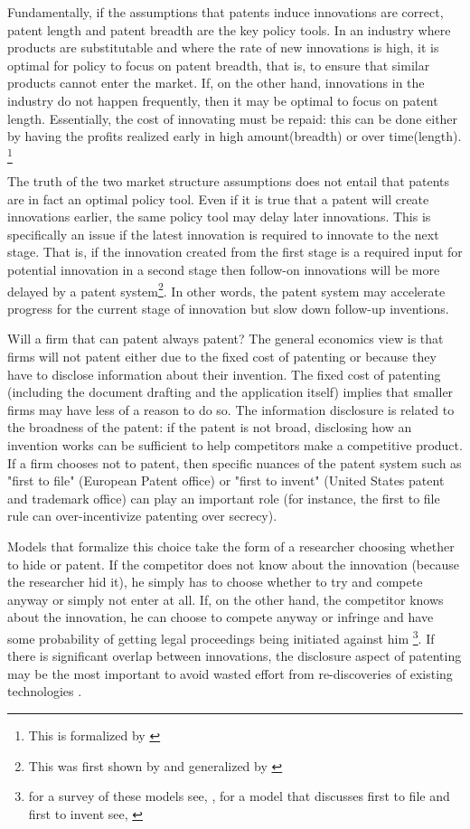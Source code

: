 Fundamentally, if the assumptions that patents induce innovations are correct, patent length and patent breadth are the key policy tools. In an industry where products are substitutable and where the rate of new innovations is high, it is optimal for policy to focus on patent breadth, that is, to ensure that similar products cannot enter the market. If, on the other hand, innovations in the industry do not happen frequently, then it may be optimal to focus on patent length. Essentially, the cost of innovating must be repaid: this can be done either by having the profits realized early in high amount(breadth) or over time(length). \footnote{This is formalized by \cite{takalo2001optimal}}

The truth of the two market structure assumptions does not entail that patents are in fact an optimal policy tool. Even if it is true that a patent will create innovations earlier, the same policy tool may delay later innovations. This is specifically an issue if the latest innovation is required to innovate to the next stage. That is, if the innovation created from the first stage is a required input for potential innovation in a second stage then follow-on innovations will be more delayed by a patent system\footnote{This was first shown by \cite{bessen_maskin} and generalized by \cite{Bryan2017}}. In other words, the patent system may accelerate progress for the current stage of innovation but slow down follow-up inventions. 

Will a firm that can patent always patent? The general economics view is that firms will not patent either due to the fixed cost of patenting or because they have to disclose information about their invention. The fixed cost of patenting (including the document drafting and the application itself) implies that smaller firms may have less of a reason to do so. The information disclosure is related to the broadness of the patent: if the patent is not broad, disclosing how an invention works can be sufficient to help competitors make a competitive product. If a firm chooses not to patent, then specific nuances of the patent system such as "first to file" (European Patent office) or "first to invent" (United States patent and trademark office) can play an important role (for instance, the first to file rule can over-incentivize patenting over secrecy).

Models that formalize this choice take the form of a researcher choosing whether to hide or patent. If the competitor does not know about the innovation (because the researcher hid it), he simply has to choose whether to try and compete anyway or simply not enter at all. If, on the other hand, the competitor knows about the innovation, he can choose to compete anyway or infringe and have some probability of getting legal proceedings being initiated against him \footnote{for a survey of these models see, \cite{Hall2014}, for a model that discusses first to file and first to invent see, \cite{Scotchmer1990} }. If there is significant overlap between innovations, the disclosure aspect of patenting may be the most important to avoid wasted effort from re-discoveries of existing technologies \citep{Kultti2007}.  


